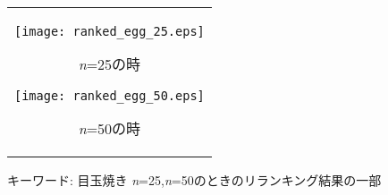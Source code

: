 \documentclass[11pt,a4j]{jreport}
\begin{document}
  \begin{figure}[htbp]
    \begin{center}
      \begin{tabular}{c}
        \begin{minipage}{0.5\hsize}
          \begin{center}
            \texttt{[image: ranked\_egg\_25.eps]}
          \end{center}
          \hspace{3cm} \textit{n}=25の時
        \end{minipage}
        \begin{minipage}{0.5\hsize}
          \begin{center}
            \texttt{[image: ranked\_egg\_50.eps]}
          \end{center}
          \hspace{3.3cm}\textit{n}=50の時
        \end{minipage}
      \end{tabular}
      \caption{キーワード: 目玉焼き \textit{n}=25,\textit{n}=50のときのリランキング結果の一部}
    \end{center}
    \end{figure}
\end{document}
